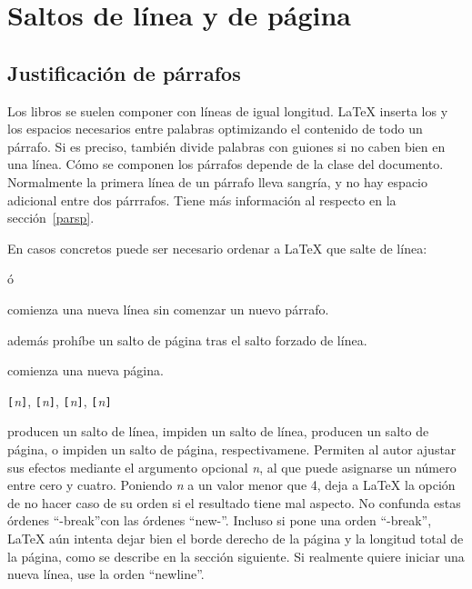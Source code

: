 \section{Saltos de línea y de página}
 
\subsection{Justificación de párrafos}

Los libros se suelen componer con líneas de igual longitud.  \LaTeX{} inserta los  y los espacios necesarios entre palabras optimizando el contenido de todo un párrafo.  Si es preciso, también divide palabras con guiones si no caben bien en una línea. Cómo se componen los párrafos depende de la clase del documento. Normalmente la primera línea de un párrafo lleva sangría, y no hay espacio adicional entre dos párrrafos.  Tiene más información al respecto en la sección~\ref{parsp}.

En casos concretos puede ser necesario ordenar a \LaTeX{} que salte de línea: 
\begin{lscommand}
\ci{\bs} ó  
\end{lscommand}
comienza una nueva línea sin comenzar un nuevo párrafo.

\begin{lscommand}
\ci{\bs*}
\end{lscommand}
además prohíbe un salto de página tras el salto forzado de línea.

\begin{lscommand}
\end{lscommand}
comienza una nueva página. 

\begin{lscommand}
\verb|[|\emph{n}\verb|]|,
\verb|[|\emph{n}\verb|]|, 
\verb|[|\emph{n}\verb|]|,
\verb|[|\emph{n}\verb|]|
\end{lscommand}

producen un salto de línea, impiden un salto de línea, producen un salto de página, o impiden un salto de página, respectivamene.  Permiten al autor ajustar sus efectos mediante el argumento opcional \emph{n}, al que puede asignarse un número entre cero y cuatro.  Poniendo \emph{n} a un valor menor que 4, deja a \LaTeX{} la opción de no hacer caso de su orden si el resultado tiene mal aspecto.  No confunda estas órdenes ``-break''con las órdenes ``new-''.  Incluso si pone una orden ``-break'', \LaTeX{} aún intenta dejar bien el borde derecho de la página y la longitud total de la página, como se describe en la sección siguiente. Si realmente quiere iniciar una nueva línea, use la orden ``newline''.

